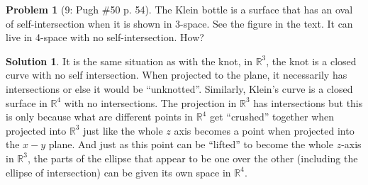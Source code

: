 \documentclass{article}
\theoremstyle{definition}
\newtheorem*{soln}{Solution}
\newtheorem*{prob}{Problem}
\theoremstyle{theorem}
\newcommand{\R}{\mathbb{R}}
\begin{document}
\begin{prob}[9: Pugh \#50 p. 54]
The Klein bottle is a surface that has an oval of self-intersection when it is shown in 3-space. See the figure in the text. It can live in 4-space with no self-intersection. How?
\end{prob}
\begin{soln}
    It is the same situation as with the knot, in $\R^3$, the knot is a closed curve with no self intersection. When projected to the plane, it necessarily has intersections or else it would be ``unknotted''. Similarly, Klein's curve is a closed surface in $\R^4$ with no intersections. The projection in $\R^3$ has  intersections but this is only because what are different points in $\R^4$ get ``crushed'' together when projected into $\R^3$ just like the whole $z$ axis becomes a point when projected into the $x-y$ plane. And just as this point can be ``lifted'' to become the whole $z$-axis in $\R^3$, the parts of the ellipse that appear to be one over the other (including the ellipse of intersection) can be given its own space in $\R^4$.

\end{soln}
\end{document}
